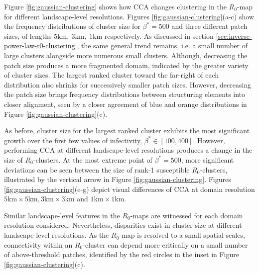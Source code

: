 Figure \ref{fig:gaussian-clustering} shows how CCA changes clustering in the $R_0$-map for different landscape-level resolutions.
Figures \ref{fig:gaussian-clustering}(a-c) show the frequency distributions of cluster size for $\beta^*=500$ and three different patch sizes, of lengths $\mathrm{5km,\ 3km,\ 1km}$ respectively.
As discussed in section \ref{sec:inverse-power-law-r0-clustering}, the same general trend remains, i.e. a small number of large clusters alongside more numerous small clusters.
Although, decreasing the patch size produces a more fragmented domain, indicated by the greater variety of cluster sizes.
The largest ranked cluster toward the far-right of each distribution also shrinks for successively smaller patch sizes.
However, decreasing the patch size brings frequency distributions between structuring elements into closer alignment, seen by a closer agreement of blue and orange distributions in Figure \ref{fig:gaussian-clustering}(c).

As before, cluster size for the largest ranked cluster exhibits the most significant growth over the first few values of infectivity, $\beta^* \in [100, 400]$.
However, performing CCA at different landscape-level resolutions produces a change in the size of $R_0$-clusters.
At the most extreme point of $\beta^*=500$, more significant deviations can be seen between the size of rank-1 susceptible $R_0$-clusters, illustrated by the vertical arrow in Figure \ref{fig:gaussian-clustering}.
Figures \ref{fig:gaussian-clustering}(e-g) depict visual differences of CCA at domain resolution $\mathrm{5km \times 5km, 3km\times 3km}$ and $\mathrm{1km\times 1km}$.

Similar landscape-level features in the $R_0$-maps are witnessed for each domain resolution considered.
Nevertheless, disparities exist in cluster size at different landscape-level resolutions.
As the $R_0$-map is resolved to a small spatial-scales, connectivity within an $R_0$-cluster can depend more critically on a small number of above-threshold patches, identified by the red circles in the inset in Figure \ref{fig:gaussian-clustering}(c).

